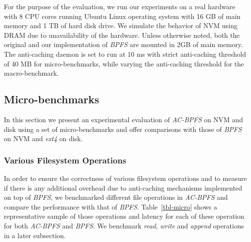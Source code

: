 For the purpose of the evaluation, we run our experiments on a real hardware with 8 CPU cores running Ubuntu Linux operating system with 16 GB of main memory and 1 TB of hard disk drive. We simulate the behavior of NVM using DRAM due to unavailability of the hardware. Unless otherwise noted, both the original and our implementation of \textit{BPFS} are mounted in 2GB of main memory. The anti-caching daemon is set to run at 10 ms with strict anti-caching threshold of 40 MB for micro-benchmarks, while varying the anti-caching threshold for the macro-benchmark.

\subsection{Micro-benchmarks}
In this section we present an experimental evaluation of \textit{AC-BPFS} on NVM and disk using a set of micro-benchmarks and offer comparisons with those of \textit{BPFS} on NVM and \textit{ext4} on disk.

\subsubsection{Various Filesystem Operations}
In order to ensure the correctness of various filesystem operations and to measure if there is any additional overhead due to anti-caching mechanisms implemented on top of \textit{BPFS}, we benchmarked different file operations in \textit{AC-BPFS} and compare the performance with that of \textit{BPFS}. Table~\ref{tbl-micro} shows a representative sample of those operations and latency for each of these operation for both \textit{AC-BPFS} and \textit{BPFS}. We benchmark \textit{read}, \textit{write} and \textit{append} operations in a later subsection.

